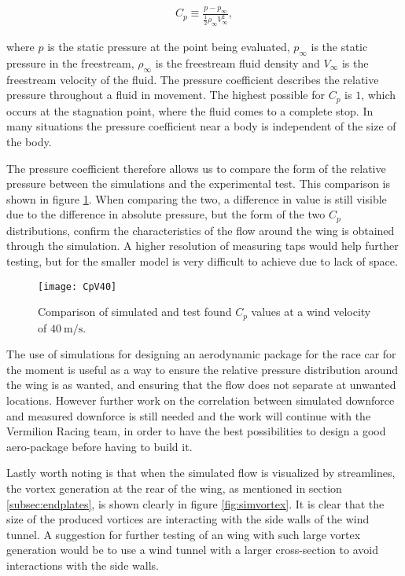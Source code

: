   \begin{align}
    C_p \equiv \frac{p-p_{\infty}}{\frac{1}{2}\rho_{\infty}V_{\infty}^2},
  \end{align}

  where $p$ is the static pressure at the point being evaluated, $p_{\infty}$ is the static pressure in the freestream, $\rho_{\infty}$ is the freestream fluid density and $V_{\infty}$ is the freestream velocity of the fluid. The pressure coefficient describes the relative pressure throughout a fluid in movement. The highest possible for $C_p$ is $1$, which occurs at the stagnation point, where the fluid comes to a complete stop. In many situations the pressure coefficient near a body is independent of the size of the body.

  The pressure coefficient therefore allows us to compare the form of the relative pressure between the simulations and the experimental test. This comparison is shown in figure \ref{fig:CpV40}. When comparing the two, a difference in value is still visible due to the difference in absolute pressure, but the form of the two $C_p$ distributions, confirm the characteristics of the flow around the wing is obtained through the simulation. A higher resolution of measuring taps would help further testing, but for the smaller model is very difficult to achieve due to lack of space.

  \begin{figure}
    \texttt{[image: CpV40]}
    \caption{Comparison of simulated and test found $C_p$ values at a wind velocity of $\SI{40}{\metre\per\second}$.}
    \label{fig:CpV40}
  \end{figure}

  The use of simulations for designing an aerodynamic package for the race car for the moment is useful as a way to ensure the relative pressure distribution around the wing is as wanted, and ensuring that the flow does not separate at unwanted locations. However further work on the correlation between simulated downforce and measured downforce is still needed and the work will continue with the Vermilion Racing team, in order to have the best possibilities to design a good aero-package before having to build it.

  Lastly worth noting is that when the simulated flow is visualized by streamlines, the vortex generation at the rear of the wing, as mentioned in section \ref{subsec:endplates}, is shown clearly in figure \ref{fig:simvortex}. It is clear that the size of the produced vortices are interacting with the side walls of the wind tunnel. A suggestion for further testing of an wing with such large vortex generation would be to use a wind tunnel with a larger cross-section to avoid interactions with the side walls.

